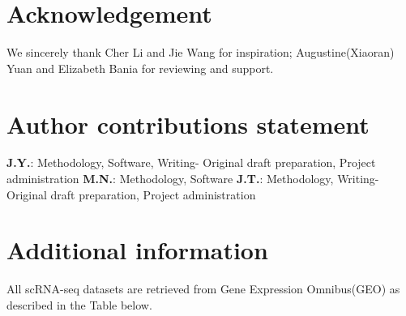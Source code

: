 \documentclass[fleqn,10pt]{wlscirep}
\begin{document}

\section*{Acknowledgement}
  We sincerely thank Cher Li and Jie Wang for inspiration; Augustine(Xiaoran) Yuan and Elizabeth Bania for reviewing and support.




\section*{Author contributions statement}
  \textbf{J.Y.}: Methodology, Software, Writing- Original draft preparation, Project administration
  \textbf{M.N.}: Methodology, Software
  \textbf{J.T.}: Methodology, Writing- Original draft preparation, Project administration

\section*{Additional information}
  All scRNA-seq datasets are retrieved from Gene Expression Omnibus(GEO) as described in the Table below.
\end{document}
